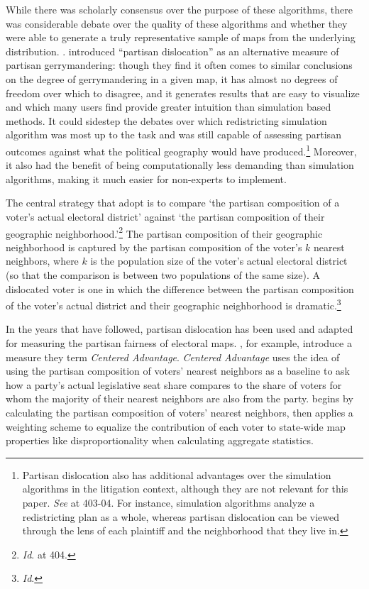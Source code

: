 \documentclass[12pt]{article}
\begin{document}
While there was scholarly consensus over the purpose of these algorithms, there was considerable debate over the quality of these algorithms and whether they were able to generate a truly representative sample of maps from the underlying distribution. \cite{cho2018sampling}. \cite{deford2022partisan} introduced ``partisan dislocation'' as an alternative measure of partisan gerrymandering: though they find it often comes to similar conclusions on the degree of gerrymandering in a given map, it has almost no degrees of freedom over which to disagree, and it generates results that are easy to visualize and which many users find provide greater intuition than simulation based methods. It could sidestep the debates over which redistricting simulation algorithm was most up to the task and was still capable of assessing partisan outcomes against what the political geography would have produced.\footnote{Partisan dislocation also has additional advantages over the simulation algorithms in the litigation context, although they are not relevant for this paper. \textit{See} \cite{deford2022partisan} at 403-04. For instance, simulation algorithms analyze a redistricting plan as a whole, whereas partisan dislocation can be viewed through the lens of each plaintiff and the neighborhood that they live in.} Moreover, it also had the benefit of being computationally less demanding than simulation algorithms, making it much easier for non-experts to implement.

The central strategy that \cite{deford2022partisan} adopt is to compare `the partisan composition of a voter's actual electoral district' against `the partisan composition of their geographic neighborhood.'\footnote{\textit{Id}. at 404.} The partisan composition of their geographic neighborhood is captured by the partisan composition of the voter's $k$ nearest neighbors, where $k$ is the population size of the voter's actual electoral district (so that the comparison is between two populations of the same size). A dislocated voter is one in which the difference between the partisan composition of the voter's actual district and their geographic neighborhood is dramatic.\footnote{\textit{Id}.}

In the years that have followed, partisan dislocation has been used and adapted for measuring the partisan fairness of electoral maps. \cite{Barton.2025}, for example, introduce a measure they term \textit{Centered Advantage}. \textit{Centered Advantage} uses the idea of using the partisan composition of voters' nearest neighbors as a baseline to ask how a party's actual legislative seat share compares to the share of voters for whom the majority of their nearest neighbors are also from the party. \cite{Wise.2025} begins by calculating the partisan composition of voters' nearest neighbors, then applies a weighting scheme to equalize the contribution of each voter to state-wide map properties like disproportionality when calculating aggregate statistics.
\end{document}
